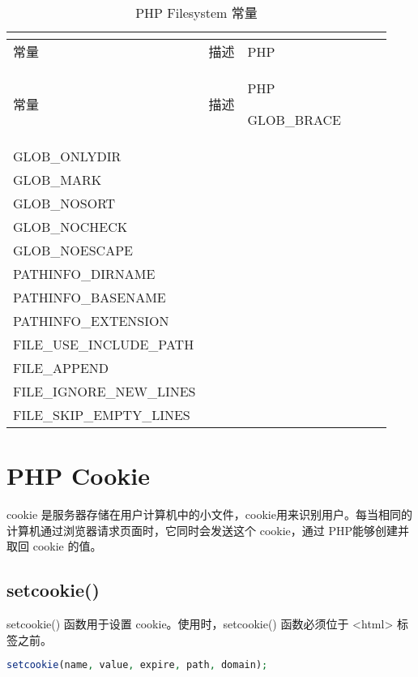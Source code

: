 \begin{longtable}{|m{125pt}|m{245pt}|m{20pt}|}
\tabularnewline\hline
常量	&描述	&PHP
\endhead

\caption{PHP Filesystem 常量}\\
\hline
常量	&描述	&PHP
\endfirsthead

\endfoot

\endlastfoot

\hline
GLOB\_BRACE	 	 &&\\
\hline
GLOB\_ONLYDIR	 &	 &\\
\hline
GLOB\_MARK	 	 &&\\
\hline
GLOB\_NOSORT	 &	 &\\
\hline
GLOB\_NOCHECK	 &	 &\\
\hline
GLOB\_NOESCAPE	 &	 &\\
\hline
PATHINFO\_DIRNAME&	 	 &\\
\hline
PATHINFO\_BASENAME&	 &\\
\hline	 
PATHINFO\_EXTENSION&	 &\\
\hline	 
FILE\_USE\_INCLUDE\_PATH&&	 	 \\
\hline
FILE\_APPEND	 	 &&\\
\hline
FILE\_IGNORE\_NEW\_LINES&	 	& \\
\hline
FILE\_SKIP\_EMPTY\_LINES	&& 	 \\
\hline
\end{longtable}



\chapter{PHP Cookie}

cookie 是服务器存储在用户计算机中的小文件，cookie用来识别用户。每当相同的计算机通过浏览器请求页面时，它同时会发送这个 cookie，通过 PHP能够创建并取回 cookie 的值。



\section{setcookie()}


setcookie() 函数用于设置 cookie。使用时，setcookie() 函数必须位于 <html> 标签之前。


\begin{lstlisting}[language=PHP]
setcookie(name, value, expire, path, domain);
\end{lstlisting}



